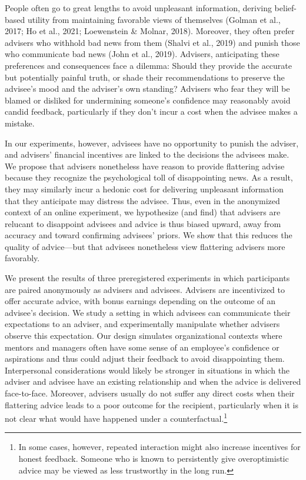 \documentclass[
  man,
  floatsintext,
  longtable,
  nolmodern,
  notxfonts,
  notimes,
  colorlinks=true,linkcolor=blue,citecolor=blue,urlcolor=blue]{apa7}
\begin{document}
People often go to great lengths to avoid unpleasant information,
deriving belief-based utility from maintaining favorable views of
themselves (Golman et al., 2017; Ho et al., 2021; Loewenstein \& Molnar,
2018). Moreover, they often prefer advisers who withhold bad news from
them (Shalvi et al., 2019) and punish those who communicate bad news
(John et al., 2019). Advisers, anticipating these preferences and
consequences face a dilemma: Should they provide the accurate but
potentially painful truth, or shade their recommendations to preserve
the advisee's mood and the adviser's own standing? Advisers who fear
they will be blamed or disliked for undermining someone's confidence may
reasonably avoid candid feedback, particularly if they don't incur a
cost when the advisee makes a mistake.

In our experiments, however, advisees have no opportunity to punish the
adviser, and advisers' financial incentives are linked to the decisions
the advisees make. We propose that advisers nonetheless have reason to
provide flattering advise because they recognize the psychological toll
of disappointing news. As a result, they may similarly incur a hedonic
cost for delivering unpleasant information that they anticipate may
distress the advisee. Thus, even in the anonymized context of an online
experiment, we hypothesize (and find) that advisers are relucant to
disappoint advisees and advice is thus biased upward, away from accuracy
and toward confirming advisees' priors. We show that this reduces the
quality of advice---but that advisees nonetheless view flattering
advisers more favorably.

We present the results of three preregistered experiments in which
participants are paired anonymously as advisers and advisees. Advisers
are incentivized to offer accurate advice, with bonus earnings depending
on the outcome of an advisee's decision. We study a setting in which
advisees can communicate their expectations to an adviser, and
experimentally manipulate whether advisers observe this expectation. Our
design simulates organizational contexts where mentors and managers
often have some sense of an employee's confidence or aspirations and
thus could adjust their feedback to avoid disappointing them.
Interpersonal considerations would likely be stronger in situations in
which the adviser and advisee have an existing relationship and when the
advice is delivered face-to-face. Moreover, advisers usually do not
suffer any direct costs when their flattering advice leads to a poor
outcome for the recipient, particularly when it is not clear what would
have happened under a counterfactual.\footnote{In some cases, however,
  repeated interaction might also increase incentives for honest
  feedback. Someone who is known to persistently give overoptimistic
  advice may be viewed as less trustworthy in the long run.}
\end{document}
